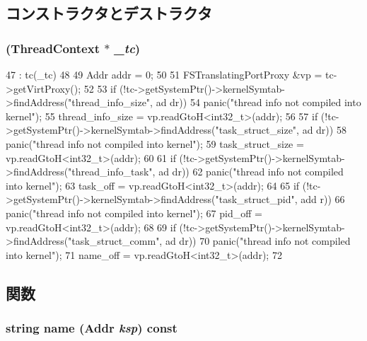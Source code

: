 \subsection{コンストラクタとデストラクタ}
\hypertarget{classArmISA_1_1ProcessInfo_a9c31978febe8b0cc8e9e76eb6791312b}{
\subsubsection[{ProcessInfo}]{ ({\bf ThreadContext} $\ast$ {\em \_\-tc})}}
\label{classArmISA_1_1ProcessInfo_a9c31978febe8b0cc8e9e76eb6791312b}



\begin{DoxyCode}
47         : tc(_tc)
48     {
49         Addr addr = 0;
50 
51         FSTranslatingPortProxy &vp = tc->getVirtProxy();
52 
53         if (!tc->getSystemPtr()->kernelSymtab->findAddress("thread_info_size", ad
      dr))
54             panic("thread info not compiled into kernel\n");
55         thread_info_size = vp.readGtoH<int32_t>(addr);
56 
57         if (!tc->getSystemPtr()->kernelSymtab->findAddress("task_struct_size", ad
      dr))
58             panic("thread info not compiled into kernel\n");
59         task_struct_size = vp.readGtoH<int32_t>(addr);
60 
61         if (!tc->getSystemPtr()->kernelSymtab->findAddress("thread_info_task", ad
      dr))
62             panic("thread info not compiled into kernel\n");
63         task_off = vp.readGtoH<int32_t>(addr);
64 
65         if (!tc->getSystemPtr()->kernelSymtab->findAddress("task_struct_pid", add
      r))
66             panic("thread info not compiled into kernel\n");
67         pid_off = vp.readGtoH<int32_t>(addr);
68 
69         if (!tc->getSystemPtr()->kernelSymtab->findAddress("task_struct_comm", ad
      dr))
70             panic("thread info not compiled into kernel\n");
71         name_off = vp.readGtoH<int32_t>(addr);
72     }
\end{DoxyCode}


\subsection{関数}
\hypertarget{classArmISA_1_1ProcessInfo_ae39ec1168c2ea31862bebf2afeda34d8}{
\subsubsection[{name}]{\setlength{\rightskip}{0pt plus 5cm}string name ({\bf Addr} {\em ksp}) const}}
\label{classArmISA_1_1ProcessInfo_ae39ec1168c2ea31862bebf2afeda34d8}



